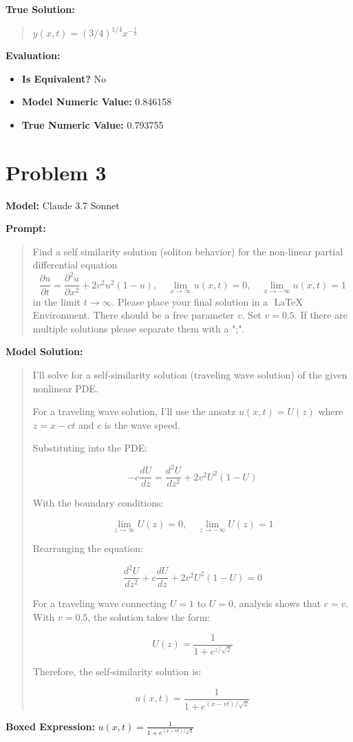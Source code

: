 \documentclass{article}
\begin{document}
\textbf{True Solution:}
\begin{quote}
$y(x,t) = (3/4)^{1/4} x^{-\frac{1}{2}}$
\end{quote}

\textbf{Evaluation:}
\begin{itemize}
\item \textbf{Is Equivalent?} No
\item \textbf{Model Numeric Value:} 0.846158
\item \textbf{True Numeric Value:} 0.793755
\end{itemize}
\vspace{1cm}
\section*{Problem 3}
\textbf{Model:} Claude 3.7 Sonnet

\textbf{Prompt:}
\begin{quote}
Find a self similarity solution (soliton behavior) for the non-linear partial differential equation $$\frac{\partial u}{\partial t} = \frac{\partial^2 u}{\partial x^2} + 2v^2 u^2 (1 - u), \quad \lim_{x \to \infty} u(x, t) = 0, \quad \lim_{x \to -\infty} u(x, t) = 1$$ in the limit $t \rightarrow \infty$. Please place your final solution in a $\boxed{}$ LaTeX Environment. There should be a free parameter $v$. Set $v=0.5$. If there are multiple solutions please separate them with a ";".
\end{quote}
\textbf{Model Solution:}
\begin{quote}
I'll solve for a self-similarity solution (traveling wave solution) of the given nonlinear PDE.



For a traveling wave solution, I'll use the ansatz $u(x,t) = U(z)$ where $z = x - ct$ and $c$ is the wave speed.



Substituting into the PDE:

$$-c\frac{dU}{dz} = \frac{d^2U}{dz^2} + 2v^2U^2(1-U)$$



With the boundary conditions:

$$\lim_{z \to \infty} U(z) = 0, \quad \lim_{z \to -\infty} U(z) = 1$$



Rearranging the equation:

$$\frac{d^2U}{dz^2} + c\frac{dU}{dz} + 2v^2U^2(1-U) = 0$$



For a traveling wave connecting $U=1$ to $U=0$, analysis shows that $c = v$. With $v = 0.5$, the solution takes the form:



$$U(z) = \frac{1}{1 + e^{z/\sqrt{2}}}$$



Therefore, the self-similarity solution is:



$$\boxed{u(x,t) = \frac{1}{1 + e^{(x-vt)/\sqrt{2}}}}$$
\end{quote}
\textbf{Boxed Expression:} $u(x,t) = \frac{1}{1 + e^{(x-vt)/\sqrt{2}}}$
\end{document}

